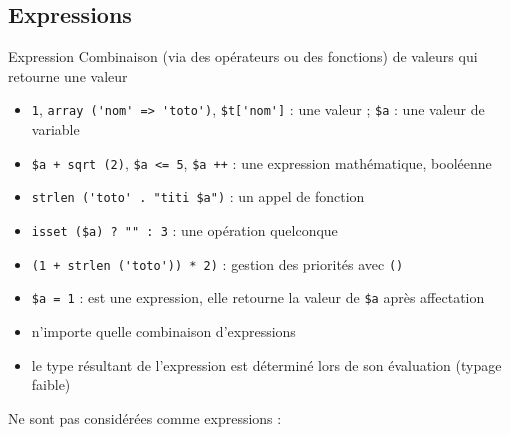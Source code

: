 \subsection{Expressions}

\begin{frame}[containsverbatim]{Expression}
	Combinaison (via des opérateurs ou des fonctions) de valeurs qui retourne une valeur
	\begin{itemize}
		\item \lstinline!1!, \lstinline!array ('nom' => 'toto')!, \lstinline!$t['nom']! : une valeur ; \lstinline!$a! : une valeur de variable
		\item \lstinline!$a + sqrt (2)!, \lstinline!$a <= 5!, \lstinline!$a ++! : une expression mathématique, booléenne
		\item \lstinline!strlen ('toto' . "titi $a")! : un appel de fonction
		\item \lstinline!isset ($a) ? "" : 3! : une opération quelconque
		\item \lstinline!(1 + strlen ('toto')) * 2)! : gestion des priorités avec \texttt{()}
		\item \lstinline!$a = 1! : est une expression, elle retourne la valeur de \lstinline!$a! après affectation
		\item n'importe quelle combinaison d'expressions
		\item le type résultant de l'expression est déterminé lors de son évaluation (typage faible)
	\end{itemize}
	Ne sont pas considérées comme expressions :
\end{frame}

